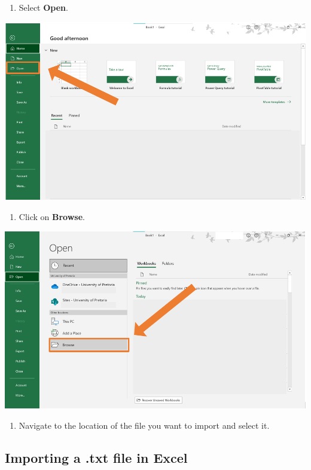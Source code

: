 \documentclass[
]{book}
\providecommand{\tightlist}{%
  \setlength{\itemsep}{0pt}\setlength{\parskip}{0pt}}
\begin{document}
\newpage

\begin{enumerate}
\def\labelenumi{\arabic{enumi}.}
\setcounter{enumi}{1}
\tightlist
\item
  Select \textbf{Open}.
\end{enumerate}

\begin{center}\includegraphics[width=0.6\linewidth]{Figures/import_open_1} \end{center}

\begin{enumerate}
\def\labelenumi{\arabic{enumi}.}
\setcounter{enumi}{2}
\tightlist
\item
  Click on \textbf{Browse}.
\end{enumerate}

\begin{center}\includegraphics[width=0.6\linewidth]{Figures/import_open_2} \end{center}

\begin{enumerate}
\def\labelenumi{\arabic{enumi}.}
\setcounter{enumi}{3}
\tightlist
\item
  Navigate to the location of the file you want to import and select it.
\end{enumerate}

\subsection{Importing a .txt file in Excel}\label{importing-a-.txt-file-in-excel}
\end{document}
